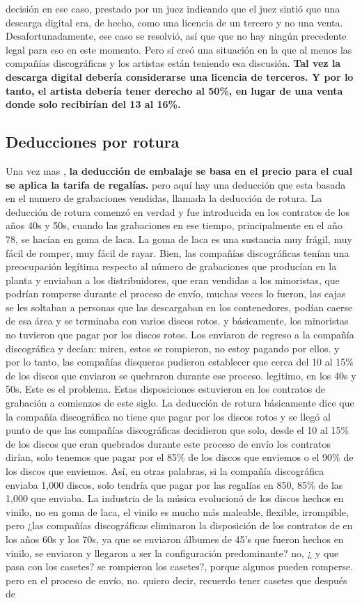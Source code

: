 \documentclass[10pt]{book}
\begin{document}
decisión en ese caso, prestado por un juez indicando que el juez sintió que una descarga digital era, de hecho, como una licencia de un tercero y no una venta. Desafortunadamente, ese caso se resolvió, así que que no hay ningún precedente legal para eso en este momento. Pero sí creó una situación en la que al menos las compañías discográficas y los artistas están teniendo esa discusión. \textbf{Tal vez la descarga digital debería considerarse una licencia de terceros. Y por lo tanto, el artista debería tener derecho al 50\%, en lugar de una venta donde solo recibirían del 13 al 16\%.}
\subsection{Deducciones por rotura}
Una vez mas ,\textbf{ la deducción de embalaje se basa en el precio para el cual se aplica la tarifa de regalías.} pero aquí hay una deducción que esta basada en el numero de grabaciones vendidas, llamada la deducción de rotura. La deducción de rotura comenzó en verdad y fue introducida en los contratos de los años 40s y 50s, cuando las grabaciones en ese tiempo, principalmente en el año 78, se hacían en goma de laca. La goma de laca es una sustancia muy frágil, muy fácil de romper, muy fácil de rayar. Bien, las compañías discográficas tenían una preocupación legítima respecto al número de grabaciones que producían en la planta y enviaban a los distribuidores, que eran vendidas a los minoristas, que podrían romperse durante el proceso de envío, muchas veces lo fueron, las cajas se les soltaban a personas que las descargaban en los contenedores, podían caerse de esa área y se terminaba con varios discos rotos. y básicamente, los minoristas no tuvieron que pagar por los discos rotos. Los enviaron de regreso a la compañía discográfica y decían: miren, estos se rompieron, no estoy pagando por ellos. y por lo tanto, las compañías disqueras pudieron establecer que cerca del 10 al 15\% de los discos que enviaron se quebraron durante ese proceso. legitimo, en los 40s y 50s. Este es el problema. Estas disposiciones estuvieron en los contratos de grabación a comienzos de este siglo. La deducción de rotura básicamente dice que la compañía discográfica no tiene que pagar por los discos rotos y se llegó al punto de que las compañías discográficas decidieron que solo, desde el 10 al 15\% de los discos que eran quebrados durante este proceso de envío los contratos dirían, solo tenemos que pagar por el 85\% de los discos que enviemos o el 90\% de los discos que enviemos. Así, en otras palabras, si la compañía discográfica enviaba 1,000 discos, solo tendría que pagar por las regalías en 850, 85\% de las 1,000 que enviaba. La industria de la música evolucionó de los discos hechos en vinilo, no en goma de laca, el vinilo es mucho más maleable, flexible, irrompible, pero ¿las compañías discográficas eliminaron la disposición de los contratos de en los años 60s y los 70s, ya que se enviaron álbumes de 45's que fueron hechos en vinilo, se enviaron y llegaron a ser la configuración predominante? no, ¿ y que pasa con los casetes? se rompieron los casetes?, porque algunos pueden romperse. pero en el proceso de envío, no. quiero decir, recuerdo tener casetes que después de 
\end{document}
